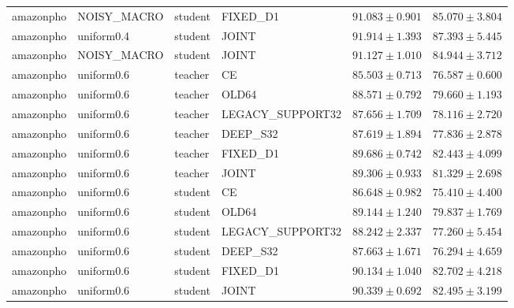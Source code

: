 \begin{longtable}{llllrr}
amazonpho & NOISY\_MACRO & student & FIXED\_D1 & $91.083 \pm 0.901$ & $85.070 \pm 3.804$ \\
amazonpho & uniform0.4 & student & JOINT & $91.914 \pm 1.393$ & $87.393 \pm 5.445$ \\
amazonpho & NOISY\_MACRO & student & JOINT & $91.127 \pm 1.010$ & $84.944 \pm 3.712$ \\
amazonpho & uniform0.6 & teacher & CE & $85.503 \pm 0.713$ & $76.587 \pm 0.600$ \\
amazonpho & uniform0.6 & teacher & OLD64 & $88.571 \pm 0.792$ & $79.660 \pm 1.193$ \\
amazonpho & uniform0.6 & teacher & LEGACY\_SUPPORT32 & $87.656 \pm 1.709$ & $78.116 \pm 2.720$ \\
amazonpho & uniform0.6 & teacher & DEEP\_S32 & $87.619 \pm 1.894$ & $77.836 \pm 2.878$ \\
amazonpho & uniform0.6 & teacher & FIXED\_D1 & $89.686 \pm 0.742$ & $82.443 \pm 4.099$ \\
amazonpho & uniform0.6 & teacher & JOINT & $89.306 \pm 0.933$ & $81.329 \pm 2.698$ \\
amazonpho & uniform0.6 & student & CE & $86.648 \pm 0.982$ & $75.410 \pm 4.400$ \\
amazonpho & uniform0.6 & student & OLD64 & $89.144 \pm 1.240$ & $79.837 \pm 1.769$ \\
amazonpho & uniform0.6 & student & LEGACY\_SUPPORT32 & $88.242 \pm 2.337$ & $77.260 \pm 5.454$ \\
amazonpho & uniform0.6 & student & DEEP\_S32 & $87.663 \pm 1.671$ & $76.294 \pm 4.659$ \\
amazonpho & uniform0.6 & student & FIXED\_D1 & $90.134 \pm 1.040$ & $82.702 \pm 4.218$ \\
amazonpho & uniform0.6 & student & JOINT & $90.339 \pm 0.692$ & $82.495 \pm 3.199$ \\
\end{longtable}
